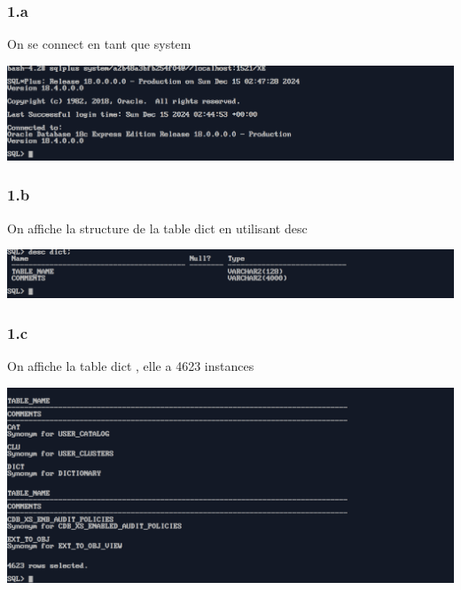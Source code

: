 \subsubsection*{1.a}
On se connect en tant que system



\begin{center}
    \includegraphics[width=\textwidth]{ScreenShot/Partie5/connectsystem.png}
\end{center}

\newpage
\subsubsection*{1.b}
On affiche la structure de la table dict en utilisant desc



\begin{center}
    \includegraphics[width=\textwidth]{ScreenShot/Partie5/dict.png}
\end{center}

\subsubsection*{1.c}
On affiche la table dict , elle a 4623 instances



\begin{center}
    \includegraphics[width=\textwidth]{ScreenShot/Partie5/selectDICT.png}
\end{center}

